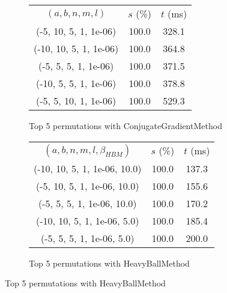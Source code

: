 \begin{figure}[H]
{\begin{subfigure}[ht]{.6\textwidth}
\begin{tabular}{|c|c|c|}
\hline
\rowcolor{gray!25}
\multicolumn{3}{|c|}{ConjugateGradientMethod} \\
\hline
\rowcolor{gray!25}
$(a,b,n,m,l)$ & $s$ (\%) & $t$ (ms) \\
\hline
(-5, 10, 5, 1, 1e-06) & 100.0 & 328.1 \\
(-10, 10, 5, 1, 1e-06) & 100.0 & 364.8 \\
(-5, 5, 5, 1, 1e-06) & 100.0 & 371.5 \\
(-10, 5, 5, 1, 1e-06) & 100.0 & 378.8 \\
(-5, 5, 10, 1, 1e-06) & 100.0 & 529.3 \\
\hline
\end{tabular}
\caption{Top 5 permutations with ConjugateGradientMethod}
\label{subfig:param_comp_MatrixSquareSum_ConjugateGradientMethod_UniformSearch}
\end{subfigure}
\hfill
\begin{subfigure}[ht]{.6\textwidth}
\centering
{}
\begin{tabular}{|c|c|c|}
\hline
\rowcolor{gray!25}
\multicolumn{3}{|c|}{HeavyBallMethod} \\
\hline
\rowcolor{gray!25}
$(a,b,n,m,l,\beta_{HBM})$ & $s$ (\%) & $t$ (ms) \\
\hline
(-10, 10, 5, 1, 1e-06, 10.0) & 100.0 & 137.3 \\
(-5, 10, 5, 1, 1e-06, 10.0) & 100.0 & 155.6 \\
(-5, 5, 5, 1, 1e-06, 10.0) & 100.0 & 170.2 \\
(-10, 10, 5, 1, 1e-06, 5.0) & 100.0 & 185.4 \\
(-5, 5, 5, 1, 1e-06, 5.0) & 100.0 & 200.0 \\
\hline
\end{tabular}
\caption{Top 5 permutations with HeavyBallMethod}
\label{subfig:param_comp_MatrixSquareSum_HeavyBallMethod_UniformSearch}
\end{subfigure}
}
\end{figure}

